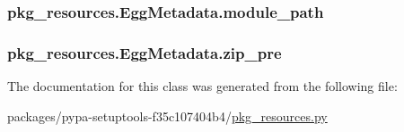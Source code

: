 \subsubsection[{module\+\_\+path}]{\setlength{\rightskip}{0pt plus 5cm}pkg\+\_\+resources.\+Egg\+Metadata.\+module\+\_\+path}\label{classpkg__resources_1_1EggMetadata_a41391e3d836916141fa95197550b1937}
\hypertarget{classpkg__resources_1_1EggMetadata_a5a1e0bd2d5340e574b3b532e8f21d363}{}
\subsubsection[{zip\+\_\+pre}]{\setlength{\rightskip}{0pt plus 5cm}pkg\+\_\+resources.\+Egg\+Metadata.\+zip\+\_\+pre}\label{classpkg__resources_1_1EggMetadata_a5a1e0bd2d5340e574b3b532e8f21d363}


The documentation for this class was generated from the following file\+:\begin{DoxyCompactItemize}
\item 
packages/pypa-\/setuptools-\/f35c107404b4/\hyperlink{pkg__resources_8py}{pkg\+\_\+resources.\+py}\end{DoxyCompactItemize}
